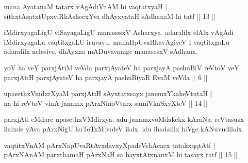 
\begin{shl}
mana AyatanaM tatarx vAgAdiVnAM hi vaqtatxyaH | \\
sithxtAsatxtUpxviRkAshecxYva dhAyxyataH sAdhanaM hi tatf \hfill|| 13 || 
\end{shl}

\begin{artha} 
iMdirxyagaLigU viSayagaLigU manasesxV Asharxya. adaralilx elAlx vAgAdi 
iMdirxyagaLa vaqtitxgaLU iruvavu. manaHpUvaRkavAgiyeV I vaqtitxgaLu 
adaralilx nelesive. dhAyxna mADuvavanige manasesxV sAdhana.
\end{artha}

\begin{shl}
\footnotemark[2]yoV ha veY parxjAtiM veVda parxjAyateV ha parxjayA pashuBiV reVtoV veY parxjAtiH parxjAyateV ha parxjayA pashuBiyaR EvaM veVda || 6 ||
\end{shl}


\begin{shl}
upasethxVnidxrXyaM parxjAtiH sAyxtatxsayx janemxYkaheVtutaH | \\
na hi reVtoV vinA janamx pArxNinoV\s tarx samiVkaSxyXteV \hfill|| 14 || 
\end{shl}

\begin{artha} 
parxjAti eMdare upasethxVMdirxya. adu janamxvoMdakekx kAraNa. reVtasusx ilalxde yAva pArxNigU huTeTxMbudeV ilalx. idu ihadalilx hiVge kANuvudilalx.
\end{artha}


\begin{shl}
vaqtitxVnAM pArxNapUvaRtAvxdavxyXpadeVshAcacx tatakxqqtAtf | \\
pArxNAnAM parxthamaH pArxNaH sa hayxtAtx\s nanxM hi tasayx tatf \hfill|| 15 || 
\end{shl}


